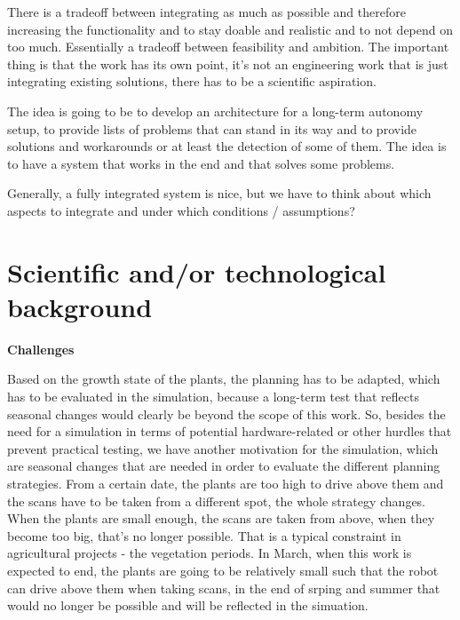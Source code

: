 \documentclass[german, master, expose, latin1]{base/thesis_KBS}
\begin{document}
There is a tradeoff between integrating as much as possible and therefore increasing the functionality and to stay doable and realistic and to not depend on too much.\newline
Essentially a tradeoff between feasibility and ambition. The important thing is that the work has its own point, it's not an engineering work that is just 
integrating existing solutions, there has to be a scientific aspiration.\newline

The idea is going to be to develop an architecture for a long-term autonomy setup, to provide lists of problems that can stand in its way and to provide solutions
and workarounds or at least the detection of some of them. The idea is to have a system that works in the end and that solves some problems.\newline

Generally, a fully integrated system is nice, but we have to think about which aspects to integrate and under which conditions / assumptions?

\section{Scientific and/or technological background}

\textbf{Challenges}\newline

Based on the growth state of the plants, the planning has to be adapted, which has to be evaluated in the simulation, because a long-term test that reflects
seasonal changes would clearly be beyond the scope of this work. So, besides the need for a simulation in terms of potential hardware-related or other hurdles
that prevent practical testing, we have another motivation for the simulation, which are seasonal changes that are needed in order to evaluate the different
planning strategies. From a certain date, the plants are too high to drive above them and the scans have to be taken from a different spot, the whole strategy changes.
When the plants are small enough, the scans are taken from above, when they become too big, that's no longer possible.
That is a typical constraint in agricultural projects - the vegetation periods.
In March, when this work is expected to end, the plants are going to be relatively small such that the robot can drive above them when taking
scans, in the end of srping and summer that would no longer be possible and will be reflected in the simuation.
\end{document}

